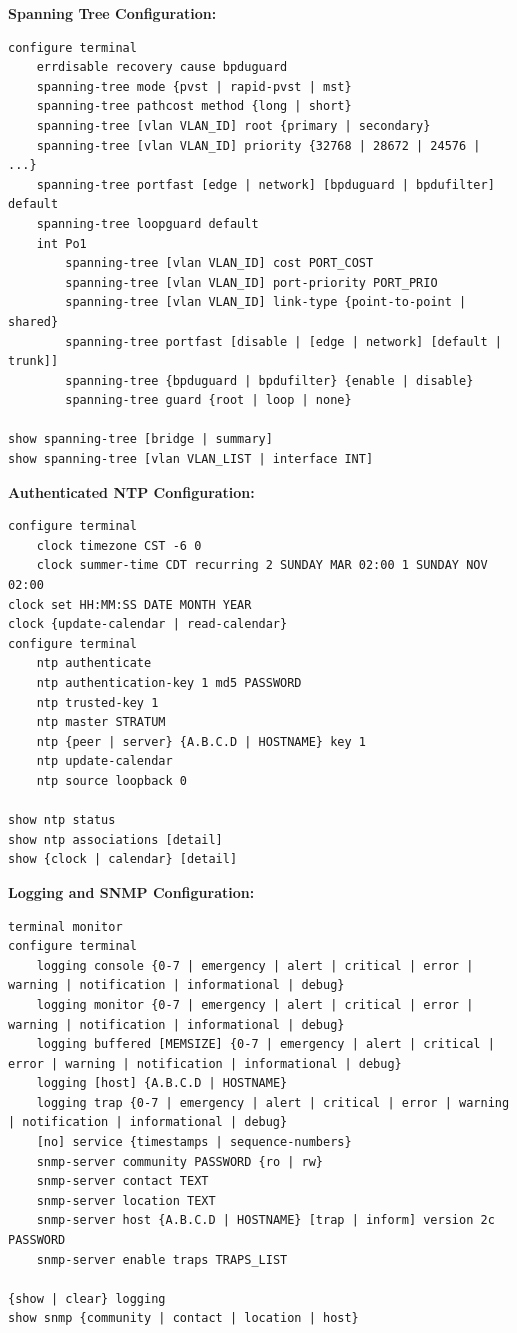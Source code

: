\documentclass[12pt]{article}
\begin{document}
	\noindent\textbf{Spanning Tree Configuration:}
	\begin{lstlisting}
configure terminal
	errdisable recovery cause bpduguard
	spanning-tree mode {pvst | rapid-pvst | mst}
	spanning-tree pathcost method {long | short}
	spanning-tree [vlan VLAN_ID] root {primary | secondary}
	spanning-tree [vlan VLAN_ID] priority {32768 | 28672 | 24576 | ...}
	spanning-tree portfast [edge | network] [bpduguard | bpdufilter] default
	spanning-tree loopguard default
	int Po1
		spanning-tree [vlan VLAN_ID] cost PORT_COST
		spanning-tree [vlan VLAN_ID] port-priority PORT_PRIO
		spanning-tree [vlan VLAN_ID] link-type {point-to-point | shared}
		spanning-tree portfast [disable | [edge | network] [default | trunk]]
		spanning-tree {bpduguard | bpdufilter} {enable | disable}
		spanning-tree guard {root | loop | none}

show spanning-tree [bridge | summary]
show spanning-tree [vlan VLAN_LIST | interface INT]
	\end{lstlisting}
	\vspace{8px}

	\noindent\textbf{Authenticated NTP Configuration:}
	\begin{lstlisting}
configure terminal
	clock timezone CST -6 0
	clock summer-time CDT recurring 2 SUNDAY MAR 02:00 1 SUNDAY NOV 02:00
clock set HH:MM:SS DATE MONTH YEAR
clock {update-calendar | read-calendar}
configure terminal
	ntp authenticate
	ntp authentication-key 1 md5 PASSWORD
	ntp trusted-key 1
	ntp master STRATUM
	ntp {peer | server} {A.B.C.D | HOSTNAME} key 1
	ntp update-calendar
	ntp source loopback 0

show ntp status
show ntp associations [detail]
show {clock | calendar} [detail]
	\end{lstlisting}
	\vspace{8px}

	\noindent\textbf{Logging and SNMP Configuration:}
	\begin{lstlisting}
terminal monitor
configure terminal
	logging console {0-7 | emergency | alert | critical | error | warning | notification | informational | debug}
	logging monitor {0-7 | emergency | alert | critical | error | warning | notification | informational | debug}
	logging buffered [MEMSIZE] {0-7 | emergency | alert | critical | error | warning | notification | informational | debug}
	logging [host] {A.B.C.D | HOSTNAME}
	logging trap {0-7 | emergency | alert | critical | error | warning | notification | informational | debug}
	[no] service {timestamps | sequence-numbers}
	snmp-server community PASSWORD {ro | rw}
	snmp-server contact TEXT
	snmp-server location TEXT
	snmp-server host {A.B.C.D | HOSTNAME} [trap | inform] version 2c PASSWORD
	snmp-server enable traps TRAPS_LIST

{show | clear} logging
show snmp {community | contact | location | host}
	\end{lstlisting}
	\vspace{8px}
\end{document}
